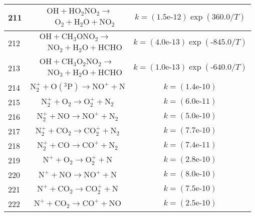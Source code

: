 \begin{longtable}{| m{} | m{}| m{} |}
\hline
 211 & $$
\begin{aligned}
&\mathrm{OH} + \mathrm{HO_2NO_2} \longrightarrow \\
&\quad \mathrm{O_2} + \mathrm{H_2O} + \mathrm{NO_2}
\end{aligned}
$$ & $$k = (\textrm{1.5e-12})\exp(\textrm{360.0}/T) $$ \\
\hline
 212 & $$
\begin{aligned}
&\mathrm{OH} + \mathrm{CH_3ONO_2} \longrightarrow \\
&\quad \mathrm{NO_2} + \mathrm{H_2O} + \mathrm{HCHO}
\end{aligned}
$$ & $$k = (\textrm{4.0e-13})\exp(\textrm{-845.0}/T) $$ \\
\hline
 213 & $$
\begin{aligned}
&\mathrm{OH} + \mathrm{CH_3O_2NO_2} \longrightarrow \\
&\quad \mathrm{NO_3} + \mathrm{H_2O} + \mathrm{HCHO}
\end{aligned}
$$ & $$k = (\textrm{1.0e-13})\exp(\textrm{-640.0}/T) $$ \\
\hline
 214 & $$ \mathrm{N_2^+} + \mathrm{O(^3P)}\longrightarrow \mathrm{NO^+} + \mathrm{N} $$ & $$k = (\textrm{1.4e-10}) $$ \\
\hline
 215 & $$ \mathrm{N_2^+} + \mathrm{O_2}\longrightarrow \mathrm{O_2^+} + \mathrm{N_2} $$ & $$k = (\textrm{6.0e-11}) $$ \\
\hline
 216 & $$ \mathrm{N_2^+} + \mathrm{NO}\longrightarrow \mathrm{NO^+} + \mathrm{N_2} $$ & $$k = (\textrm{5.0e-10}) $$ \\
\hline
 217 & $$ \mathrm{N_2^+} + \mathrm{CO_2}\longrightarrow \mathrm{CO_2^+} + \mathrm{N_2} $$ & $$k = (\textrm{7.7e-10}) $$ \\
\hline
 218 & $$ \mathrm{N_2^+} + \mathrm{CO}\longrightarrow \mathrm{CO^+} + \mathrm{N_2} $$ & $$k = (\textrm{7.4e-11}) $$ \\
\hline
 219 & $$ \mathrm{N^+} + \mathrm{O_2}\longrightarrow \mathrm{O_2^+} + \mathrm{N} $$ & $$k = (\textrm{2.8e-10}) $$ \\
\hline
 220 & $$ \mathrm{N^+} + \mathrm{NO}\longrightarrow \mathrm{NO^+} + \mathrm{N} $$ & $$k = (\textrm{8.0e-10}) $$ \\
\hline
 221 & $$ \mathrm{N^+} + \mathrm{CO_2}\longrightarrow \mathrm{CO_2^+} + \mathrm{N} $$ & $$k = (\textrm{7.5e-10}) $$ \\
\hline
 222 & $$ \mathrm{N^+} + \mathrm{CO_2}\longrightarrow \mathrm{CO^+} + \mathrm{NO} $$ & $$k = (\textrm{2.5e-10}) $$ \\

\end{longtable}
